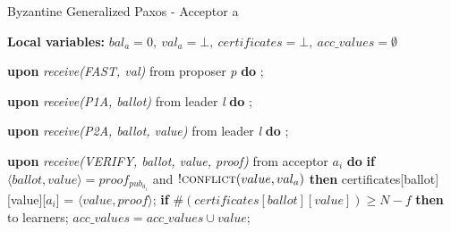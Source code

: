 \begin{algorithm}
\begin{algorithmic}[1]
		\iffalse \State
		\Function{proved\_safe}{Q, m}
		\State $k = max(i\ |\ (i < m) \wedge (\exists a \in Q :\ val_a[i]\ \neq null))$;
		\State $RS = \{R \in k$-$quorum\ |\ \forall a \in R \cap Q : val_a[k] \neq null\}$;
		\State $\gamma(R) = \sqcap \{v_a[k]\ |\ a \in Q \cap R \}$;
		\State $\Gamma = \{\gamma(R)\ |\ R \in RS \}$;
		\State
		\If{$RS = \varnothing$}
		\State \textbf{return} $\{val_a[k]\ |\ (a \in Q) \wedge (val_a[k] \neq null)\}$;
		\Else
		\State \textbf{return} $\sqcup \Gamma$;
		\EndIf
		\EndFunction
		\fi
		
	\end{algorithmic}
\end{algorithm}

\begin{algorithm} 
	\caption{Byzantine Generalized Paxos - Acceptor a}
	\label{BFT-Acc}
	\textbf{Local variables: } $bal_a = 0,\ val_a = \bot,\ certificates = \bot,\ acc\_values = \emptyset$ 
	\begin{algorithmic}[1]
		
		\State \textbf{upon} \textit{receive(FAST, val)} from proposer \textit{p} \textbf{do}
		\State \hspace{\algorithmicindent} ;
		
		\State
		\State \textbf{upon} \textit{receive(P1A, ballot)} from leader \textit{l} \textbf{do}
		\State \hspace{\algorithmicindent} ;
		
		\State
		\State \textbf{upon} \textit{receive(P2A, ballot, value)} from leader \textit{l} \textbf{do}
		\State \hspace{\algorithmicindent} ; 
		
		\State 
		\State \textbf{upon} \textit{receive(VERIFY, ballot, value, proof)} from acceptor $a_i$ \textbf{do}
		\State \hspace{\algorithmicindent} \textbf{if} $\langle ballot, value \rangle = proof_{pub_{a_i}}$ and $!\Call{conflict}{value,val_a}$  \textbf{then}
		\State \hspace{\algorithmicindent}\hspace{\algorithmicindent} certificates[ballot][value][$a_i$] = $\langle value, proof \rangle$;
		\State
		\State \hspace{\algorithmicindent} \textbf{if} $\#(certificates[ballot][value]) \geq N-f$ \textbf{then}
		\State \hspace{\algorithmicindent}\hspace{\algorithmicindent}  to learners;
		\State \hspace{\algorithmicindent}\hspace{\algorithmicindent} $acc\_values = acc\_values \cup  value$;
			

\end{algorithmic}
\end{algorithm}
